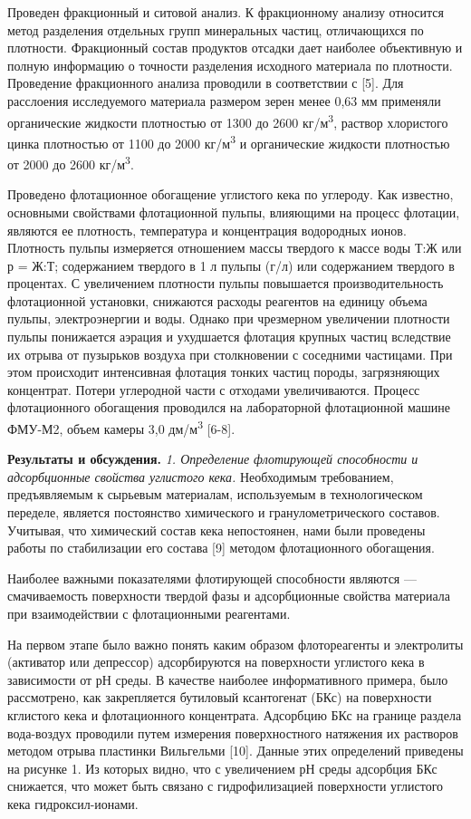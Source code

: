 Проведен фракционный и ситовой анализ. К фракционному анализу относится
метод разделения отдельных групп минеральных ча­стиц, отличающихся по
плотности. Фракцион­ный состав продуктов отсадки дает наиболее
объективную и полную информацию о точности разделения исходного
мате­риала по плотности. Проведение фракционного анализа проводили в
соответствии с {[}5{]}. Для расслоения исследуемого материала размером
зерен менее 0,63 мм применяли органические жидкости плотностью от 1300
до 2600 кг/м\textsuperscript{3}, раствор хлористого цинка плотностью от
1100 до 2000 кг/м\textsuperscript{3} и органические жидкости плотностью
от 2000 до 2600 кг/м\textsuperscript{3}.

Проведено флотационное обогащение углистого кека по углероду. Как
известно, основными свойствами флотационной пульпы, влияющими на процесс
флотации, являются ее плотность, температура и концентрация водородных
ионов. Плотность пульпы измеряется отношением массы твердого к массе
воды Т:Ж или р = Ж:Т; содержанием твердого в 1 л пульпы (г/л) или
содержанием твердого в процентах. С увеличением плотности пульпы
повышается производительность флотационной установки, снижаются расходы
реагентов на единицу объема пульпы, электроэнергии и воды. Однако при
чрезмерном увеличении плотности пульпы понижается аэрация и ухудшается
флотация крупных частиц вследствие их отрыва от пузырьков воздуха при
столкновении с соседними частицами. При этом происходит интенсивная
флотация тонких частиц породы, загрязняющих концентрат. Потери
углеродной части с отходами увеличиваются. Процесс флотационного
обогащения проводился на лабораторной флотационной машине ФМУ-М2, объем
камеры 3,0 дм/м\textsuperscript{3} {[}6-8{]}.

{\bfseries Результаты и обсуждения.} \emph{1. Определение флотирующей
способности и адсорбционные свойства углистого кека.} Необходимым
требованием, предъявляемым к сырьевым материалам, используемым в
технологическом переделе, является постоянство химического и
гранулометрического составов. Учитывая, что химический состав кека
непостоянен, нами были проведены работы по стабилизации его состава
{[}9{]} методом флотационного обогащения.

Наиболее важными показателями флотирующей способности являются ---
смачиваемость поверхности твердой фазы и адсорбционные свойства
материала при взаимодействии с флотационными реагентами.

На первом этапе было важно понять каким образом флотореагенты и
электролиты (активатор или депрессор) адсорбируются на поверхности
углистого кека в зависимости от рН среды. В качестве наиболее
информативного примера, было рассмотрено, как закрепляется бутиловый
ксантогенат (БКс) на поверхности кглистого кека и флотационного
концентрата. Адсорбцию БКс на границе раздела вода-воздух проводили
путем измерения поверхностного натяжения их растворов методом отрыва
пластинки Вильгельми {[}10{]}. Данные этих определений приведены на
рисунке 1. Из которых видно, что с увеличением рН среды адсорбция БКс
снижается, что может быть связано с гидрофилизацией поверхности
углистого кека гидроксил-ионами.

